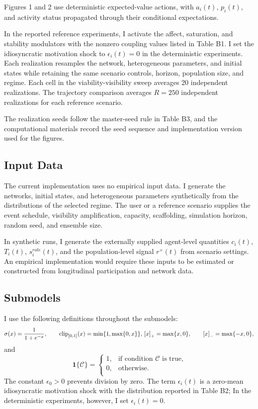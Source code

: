 \documentclass[11pt]{article}
\newcommand{\clip}{\operatorname{clip}_{[0,1]}}
\begin{document}
Figures 1 and 2 use deterministic expected-value actions, with $a_i(t)$, $p_i(t)$, and activity status propagated through their conditional expectations.

In the reported reference experiments, I activate the affect, saturation, and stability modulators with the nonzero coupling values listed in Table B1. I set the idiosyncratic motivation shock to $\epsilon_i(t)=0$ in the deterministic experiments. Each realization resamples the network, heterogeneous parameters, and initial states while retaining the same scenario controls, horizon, population size, and regime. Each cell in the viability-visibility sweep averages 20 independent realizations. The trajectory comparison averages $R=250$ independent realizations for each reference scenario. 

The realization seeds follow the master-seed rule in Table B3, and the computational materials record the seed sequence and implementation version used for the figures.

\subsection{Input Data}
The current implementation uses no empirical input data. I generate the networks, initial states, and heterogeneous parameters synthetically from the distributions of the selected regime. The user or a reference scenario supplies the event schedule, visibility amplification, capacity, scaffolding, simulation horizon, random seed, and ensemble size.

In synthetic runs, I generate the externally supplied agent-level quantities $c_i(t)$, $T_i(t)$, $s_i^{role}(t)$, and the population-level signal $r^+(t)$ from scenario settings. An empirical implementation would require these inputs to be estimated or constructed from longitudinal participation and network data.

\subsection{Submodels}
I use the following definitions throughout the submodels:
\[
\sigma(x)=\frac{1}{1+e^{-x}}, \qquad \clip(x)=\min\{1, \max\{0, x\}\}, \\
\left[ x \right]_+ = \max\{x,0\}, \qquad \left[ x \right]_- = \max\{-x,0\},
\]
and
\[
\mathbf{1}\{\mathcal{C}\}=
\begin{cases}
    1, & \text{if condition  }  \mathcal{C} \text{ is true,} \\
    0, & \text{otherwise.} \\
\end{cases}
\]
The constant $\epsilon_0>0$ prevents division by zero. The term $\epsilon_i(t)$ is a zero-mean idiosyncratic motivation shock with the distribution reported in Table B2; In the deterministic experiments, however, I set $\epsilon_i(t)=0$.
\end{document}
